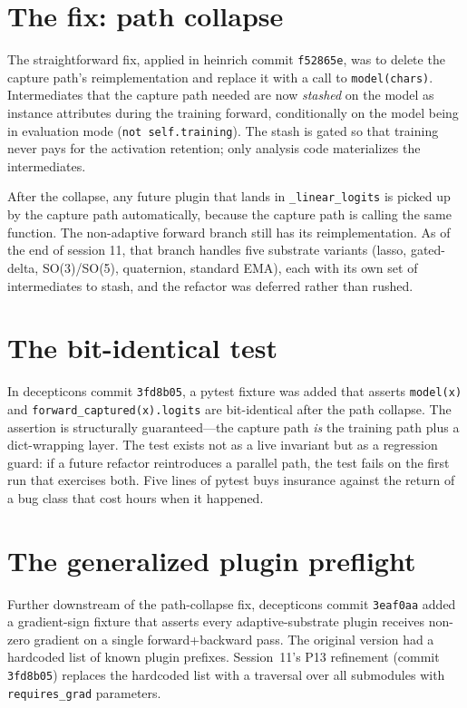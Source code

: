 \documentclass[11pt,openany]{book}
\begin{document}
\section{The fix: path collapse}

The straightforward fix, applied in heinrich commit \texttt{f52865e},
was to delete the capture path's reimplementation and replace it with
a call to \texttt{model(chars)}. Intermediates that the capture path
needed are now \emph{stashed} on the model as instance attributes
during the training forward, conditionally on the model being in
evaluation mode (\texttt{not self.training}). The stash is gated so
that training never pays for the activation retention; only analysis
code materializes the intermediates.

After the collapse, any future plugin that lands in
\texttt{\_linear\_logits} is picked up by the capture path
automatically, because the capture path is calling the same function.
The non-adaptive forward branch still has its reimplementation. As
of the end of session 11, that branch handles five substrate variants
(lasso, gated-delta, SO(3)/SO(5), quaternion, standard EMA), each with
its own set of intermediates to stash, and the refactor was deferred
rather than rushed.

\section{The bit-identical test}

In decepticons commit \texttt{3fd8b05}, a pytest fixture was added
that asserts \texttt{model(x)} and \texttt{forward\_captured(x).logits}
are bit-identical after the path collapse. The assertion is
structurally guaranteed---the capture path \emph{is} the training
path plus a dict-wrapping layer. The test exists not as a live
invariant but as a regression guard: if a future refactor reintroduces
a parallel path, the test fails on the first run that exercises both.
Five lines of pytest buys insurance against the return of a bug class
that cost hours when it happened.

\section{The generalized plugin preflight}

Further downstream of the path-collapse fix, decepticons commit
\texttt{3eaf0aa} added a gradient-sign fixture that asserts every
adaptive-substrate plugin receives non-zero gradient on a single
forward+backward pass. The original version had a hardcoded list of
known plugin prefixes. Session~11's P13 refinement (commit
\texttt{3fd8b05}) replaces the hardcoded list with a traversal over
all submodules with \texttt{requires\_grad} parameters.
\end{document}
